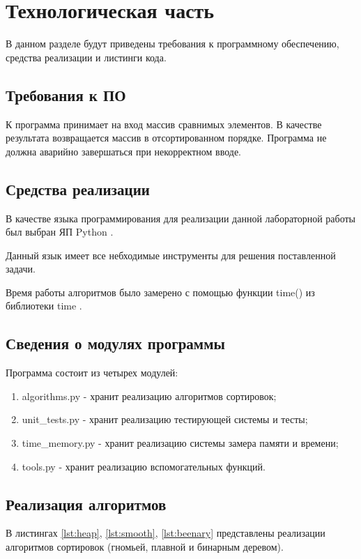 \chapter{Технологическая часть}

В данном разделе будут приведены требования к программному обеспечению, средства реализации и листинги кода.

\section{Требования к ПО}

К программа принимает на вход массив сравнимых элементов. В качестве результата возвращается массив в отсортированном порядке. Программа не должна аварийно завершаться при некорректном вводе.

\section{Средства реализации}

В качестве языка программирования для реализации данной лабораторной работы был выбран ЯП Python \cite{pythonlang}. 

Данный язык имеет все небходимые инструменты для решения поставленной задачи.

Время работы алгоритмов было замерено с помощью функции time() из библиотеки time \cite{pythonlangtime}.

\section{Сведения о модулях программы}
Программа состоит из четырех модулей:
\begin{enumerate}
	\item algorithms.py - хранит реализацию алгоритмов сортировок;
	\item unit\_tests.py - хранит реализацию тестирующей системы и тесты;
	\item time\_memory.py - хранит реализацию системы замера памяти и времени;
	\item tools.py - хранит реализацию вспомогательных функций.
\end{enumerate}


\section{Реализация алгоритмов}
В листингах \ref{lst:heap}, \ref{lst:smooth}, \ref{lst:beenary} представлены реализации алгоритмов сортировок (гномьей, плавной и бинарным деревом).

